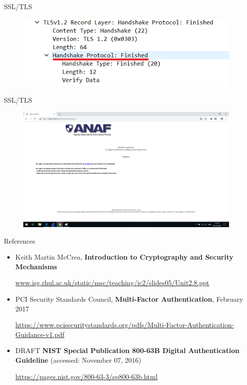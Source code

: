 \documentclass[pdf]{beamer}
\begin{document}
\begin{frame}{SSL/TLS}

\begin{figure}[t]
\centering
\includegraphics[scale=0.7]{Images/tls7}
\end{figure}

\end{frame}



\begin{frame}{SSL/TLS}

\begin{figure}[t]
\centering
\includegraphics[scale=0.28]{Images/tls8}
\end{figure}

\end{frame}



\begin{frame}{References}
\begin{itemize}
\item
Keith Martin McCrea, \textbf{Introduction to Cryptography and Security Mechanisms}

\url{www.isg.rhul.ac.uk/static/msc/teaching/ic2/slides05/Unit2.8.ppt}

\item
PCI Security Standards Council, \textbf{Multi-Factor Authentication}, February 2017

\url{https://www.pcisecuritystandards.org/pdfs/Multi-Factor-Authentication-Guidance-v1.pdf}

\item
DRAFT \textbf{NIST Special Publication 800-63B Digital Authentication Guideline} (accessed: November 07, 2016)

\url{https://pages.nist.gov/800-63-3/sp800-63b.html}

\end{itemize}
\end{frame}
\end{document}

